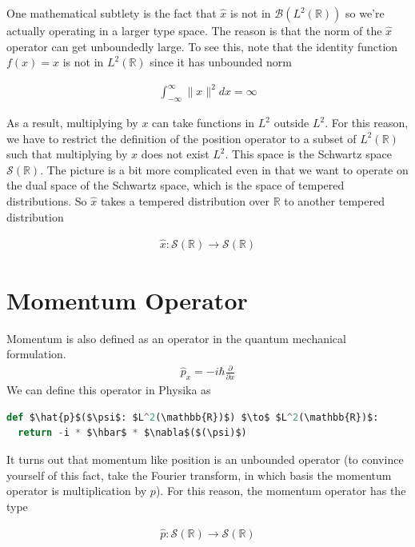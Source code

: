 \documentclass[book.tex]{subfiles}
\begin{document}
One mathematical subtlety is the fact that $\hat{x}$ is not in $\mathcal{B}(L^2(\mathbb{R}))$ so we're actually operating in a larger type space. The reason is that the norm of the $\hat{x}$ operator can get unboundedly large. To see this, note that the identity function $f(x) = x$ is not in $L^2(\mathbb{R})$ since it has unbounded norm

\begin{align}
    \int_{-\infty}^{\infty}\|x\|^2 dx = \infty
\end{align}

As a result, multiplying by $x$ can take functions in $L^2$ outside $L^2$. For this reason, we have to restrict the definition of the position operator to a subset of $L^2(\mathbb{R})$ such that multiplying by $x$ does not exist $L^2$. This space is the Schwartz space $\mathcal{S}(\mathbb{R})$. The picture is a bit more complicated even in that we want to operate on the dual space of the Schwartz space, which is the space of tempered distributions. So $\hat{x}$ takes a tempered distribution over $\mathbb{R}$ to another tempered distribution

\begin{align}
\hat{x}: \mathcal{S}(\mathbb{R}) \to \mathcal{S}(\mathbb{R})
\end{align}

\section{Momentum Operator} 
Momentum is also defined as an operator in the quantum mechanical formulation.
\begin{align}
\hat{p}_x = -i \hbar \frac{\partial}{\partial x}
\end{align}
We can define this operator in Physika as
\begin{lstlisting}[language=python]
def $\hat{p}$($\psi$: $L^2(\mathbb{R})$) $\to$ $L^2(\mathbb{R})$:
  return -i * $\hbar$ * $\nabla$($(\psi)$)
\end{lstlisting}

It turns out that momentum like position is an unbounded operator (to convince yourself of this fact, take the Fourier transform, in which basis the momentum operator is multiplication by $p$). For this reason, the momentum operator has the type

\begin{align}
\hat{p}: \mathcal{S}(\mathbb{R}) \to \mathcal{S}(\mathbb{R})
\end{align}
\end{document}
